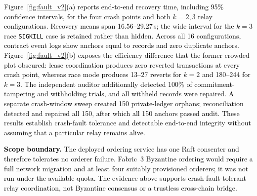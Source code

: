 \documentclass[final,5p,times,twocolumn]{elsarticle}
\begin{document}
\begin{table}[!htbp]
\centering
\caption{\textcolor{red}{Relay drain rate $\mu_{\mathrm{relay}}$ (anchors/s, mean $\pm$ 95\% CI over five repetitions) under emulated public-chain congestion, with the prediction $k/B$ in parentheses. $B$ is the fixed block interval; each run drains 20 outbox rows with $k$ lease relays.}}
\label{tab:congestion}
\setlength{\tabcolsep}{3pt}
\end{table}


\textcolor{black}{Figure~\ref{fig:fault_v2}(a) reports end-to-end recovery time, including 95\% confidence intervals, for the four crash points and both $k=2,3$ relay configurations. Recovery means span 16.56--29.27\,s; the wide interval for the $k=3$ race \texttt{SIGKILL} case is retained rather than hidden. Across all 16 configurations, contract event logs show anchors equal to records and zero duplicate anchors. Figure~\ref{fig:fault_v2}(b) exposes the efficiency difference that the former crowded plot obscured: lease coordination produces zero reverted transactions at every crash point, whereas race mode produces 13--27 reverts for $k=2$ and 180--244 for $k=3$. The independent auditor additionally detected 100\% of commitment-tampering and withholding trials, and all withheld records were repaired. A separate crash-window sweep created 150 private-ledger orphans; reconciliation detected and repaired all 150, after which all 150 anchors passed audit. These results establish crash-fault tolerance and detectable end-to-end integrity without assuming that a particular relay remains alive.}



\textcolor{black}{\textbf{Scope boundary.} The deployed ordering service has one Raft consenter and therefore tolerates no orderer failure. Fabric~3 Byzantine ordering would require a full network migration and at least four suitably provisioned orderers; it was not run under the available quota. The evidence above supports crash-fault-tolerant relay coordination, not Byzantine consensus or a trustless cross-chain bridge.}
\end{document}
